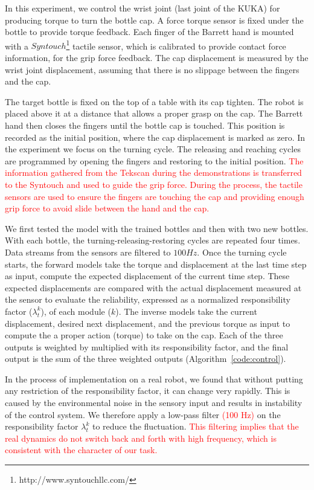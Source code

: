 In this experiment, we control the wrist joint (last joint of the KUKA)
for producing torque to turn the bottle cap. A force torque sensor is
fixed under the bottle to provide torque feedback. Each finger of the
Barrett hand is mounted with a
$Syntouch$\footnote{http://www.syntouchllc.com/} tactile sensor, which
is calibrated to provide contact force information, for the grip force
feedback. The cap displacement is measured by the wrist joint
displacement, assuming that there is no slippage between the fingers and
the cap.

The target bottle is fixed on the top of a table with its cap
tighten. The robot is placed above it at a distance that allows a
proper grasp on the cap. The Barrett hand then closes the fingers until
the bottle cap is touched. This position is recorded as the initial
position, where the cap displacement is marked as zero. In the
experiment we focus on the turning cycle. The releasing and reaching
cycles are programmed by opening the fingers and restoring to the
initial position. \textcolor{red}{ The information gathered from the Tekscan during the demonstrations is transferred to the Syntouch and used to guide the grip force. During the process, the tactile sensors are used to ensure the fingers are touching the cap and providing enough grip force to avoid slide between the hand and the cap.}

We first tested the model with the trained bottles and then with two
new bottles. With each bottle, the turning-releasing-restoring cycles
are repeated four times. Data streams from the sensors are filtered to
$100Hz$. Once the turning cycle starts, the forward models take the
torque and displacement at the last time step as input, compute the
expected displacement of the current time step. These expected
displacements are compared with the actual displacement measured at
the sensor to evaluate the reliability, expressed as a normalized
responsibility factor ($\lambda_t^k$), of each module ($k$). The inverse models
take the current displacement, desired next displacement, and the
previous torque as input to compute the a proper action
(torque) to take on the cap. Each of the three outputs is weighted by
multiplied with its responsibility factor, and the final output is the sum of the three weighted outputs (Algorithm~\ref{code:control}).

In the process of implementation on a real robot, we found that
without putting any restriction of the responsibility factor, it can
change very rapidly. This is caused by the environmental noise in the
sensory input and results in instability of the control system. We
therefore apply a low-pass filter \textcolor{red}{(100 Hz)} on the responsibility factor
$\lambda_t^k$ to reduce the fluctuation. \textcolor{red}{This filtering implies that
the real dynamics do not switch back and forth with high frequency, which is consistent
with the character of our task.} %

